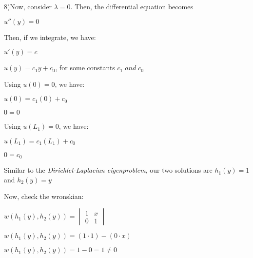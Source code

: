 \documentclass[12pt, executivepaper]{article}
\begin{document}
\begin{flushleft}

8)Now, consider $\lambda=0$. Then, the differential equation becomes

\begin{center}

$u''(y)=0$

\end{center}

Then, if we integrate, we have: 

\begin{center}

$u'(y)=c$

$u(y)=c_{1}y+c_{0}$, for some constants $c_{1} \; and \; c_{0}$

\end{center}

Using $u(0)=0$, we have:

\pagebreak

\vspace*{-40mm}

\begin{center}

$u(0)=c_{1}(0)+c_{0}$

$0=0$

\end{center}

Using $u(L_{1})=0$, we have: 

\begin{center}

$u(L_{1})=c_{1}(L_{1})+c_{0}$

$0=c_{0}$

\end{center}

Similar to the \textit{Dirichlet-Laplacian eigenproblem}, our two solutions are $h_{1}(y)=1$ and $h_{2}(y)=y$

\vspace{3mm}

Now, check the wronskian:

\begin{center}

$w(h_{1}(y), h_{2}(y))=\begin{vmatrix}
1 & x \\ 
0 & 1 
\end{vmatrix}$

$w(h_{1}(y), h_{2}(y))=(1 \cdot 1)-(0 \cdot x)$

$w(h_{1}(y), h_{2}(y))=1-0=1 \neq 0$

\end{center}


\end{flushleft}
\end{document}
